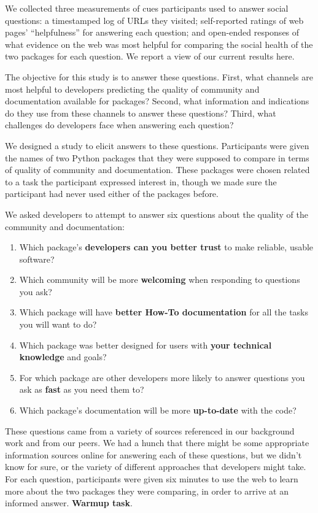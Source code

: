 We collected three measurements of cues participants used to answer social questions:
a timestamped log of URLs they visited;
self-reported ratings of web pages' ``helpfulness'' for answering each question;
and open-ended responses of what evidence on the web was most helpful for comparing the social health of the two packages for each question.
We report a view of our current results here.


The objective for this study is to answer these questions.
First, what channels are most helpful to developers predicting the quality of community and documentation available for packages?
Second, what information and indications do they use from these channels to answer these questions?
Third, what challenges do developers face when answering each question?

We designed a study to elicit answers to these questions.
Participants were given the names of two Python packages that they were supposed to compare in terms of quality of community and documentation.
These packages were chosen related to a task the participant expressed interest in, though we made sure the participant had never used either of the packages before.

We asked developers to attempt to answer six questions about the quality of the community and documentation:
\begin{enumerate}
\setlength{\itemsep}{0pt}
\setlength{\parskip}{0pt}
\setlength{\parsep}{0pt}
\item Which package's \textbf{developers can you better trust} to make reliable, usable software?
\item Which community will be more \textbf{welcoming} when responding to questions you ask?
\item Which package will have \textbf{better How-To documentation} for all the tasks you will want to do?
\item Which package was better designed for users with \textbf{your technical knowledge} and goals?
\item For which package are other developers more likely to answer questions you ask as \textbf{fast} as you need them to?
\item Which package's documentation will be more \textbf{up-to-date} with the code?
\end{enumerate}
These questions came from a variety of sources referenced in our background work and from our peers.
We had a hunch that there might be some appropriate information sources online for answering each of these questions, but we didn't know for sure, or the variety of different approaches that developers might take.
For each question, participants were given six minutes to use the web to learn more about the two packages they were comparing, in order to arrive at an informed answer.
\textbf{Warmup task}.

